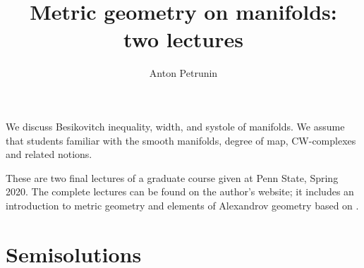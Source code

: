 \documentclass[twoside]{book}
\begin{document}
 
\title{Metric geometry on manifolds:
\\ two lectures}
\author{Anton Petrunin}
\date{}
\maketitle

We discuss Besikovitch inequality, width, and systole of manifolds.
We assume that students familiar with the smooth manifolds, degree of map, CW-complexes and related notions.

These are two final lectures of a graduate course given at Penn State, Spring 2020.
The complete lectures can be found on the author's website;
it includes an introduction to metric geometry \cite{petrunin2020pure}
and elements of Alexandrov geometry based on \cite{alexander-kapovitch-petrunin-2019}.

\thispagestyle{empty}
\tableofcontents
\thispagestyle{empty}

%



%
%
%
\appendix
\chapter{Semisolutions}


%
{\small\sloppy


\printbibliography[heading=bibintoc]
\fussy
}
\end{document}
